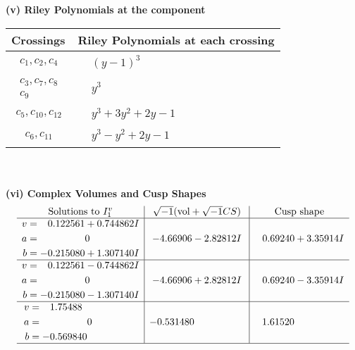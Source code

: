 \documentclass[1p]{elsarticle_modified}
\theoremstyle{definition}
\newcommand{\I}{\sqrt{-1}}
\begin{document}
\newpage\renewcommand{\arraystretch}{1}
\flushleft \textbf{(v) Riley Polynomials at the component}\newline \\
\begin{tabular}{m{50pt}|m{274pt}}
Crossings & \hspace{64pt}Riley Polynomials at each crossing \\
\hline $$\begin{aligned}c_{1},c_{2},c_{4}\end{aligned}$$&$\begin{aligned}
&(y-1)^3
\end{aligned}$\\
\hline $$\begin{aligned}c_{3},c_{7},c_{8}\\c_{9}\end{aligned}$$&$\begin{aligned}
&y^3
\end{aligned}$\\
\hline $$\begin{aligned}c_{5},c_{10},c_{12}\end{aligned}$$&$\begin{aligned}
&y^3+3 y^2+2 y-1
\end{aligned}$\\
\hline $$\begin{aligned}c_{6},c_{11}\end{aligned}$$&$\begin{aligned}
&y^3- y^2+2 y-1
\end{aligned}$\\
\hline
\end{tabular}\\~\\
\newpage\flushleft \textbf{(vi) Complex Volumes and Cusp Shapes}
$$\begin{array}{c|c|c}  
\text{Solutions to }I^v_{1}& \I (\text{vol} + \sqrt{-1}CS) & \text{Cusp shape}\\
 \hline 
\begin{aligned}
v &= \phantom{-}0.122561 + 0.744862 I \\
a &= \phantom{-0.000000 } 0 \\
b &= -0.215080 + 1.307140 I\end{aligned}
 & -4.66906 - 2.82812 I & \phantom{-}0.69240 + 3.35914 I \\ \hline\begin{aligned}
v &= \phantom{-}0.122561 - 0.744862 I \\
a &= \phantom{-0.000000 } 0 \\
b &= -0.215080 - 1.307140 I\end{aligned}
 & -4.66906 + 2.82812 I & \phantom{-}0.69240 - 3.35914 I \\ \hline\begin{aligned}
v &= \phantom{-}1.75488\phantom{ +0.000000I} \\
a &= \phantom{-0.000000 } 0 \\
b &= -0.569840\phantom{ +0.000000I}\end{aligned}
 & -0.531480\phantom{ +0.000000I} & \phantom{-}1.61520\phantom{ +0.000000I}\\
 \hline 
 \end{array}$$\newpage
\end{document}
